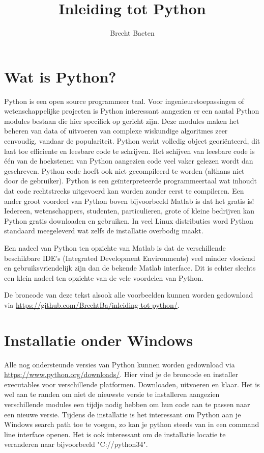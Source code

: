 \documentclass[11pt,twoside]{article}
\title{Inleiding tot Python}
\author{Brecht Baeten}
\begin{document}
	\maketitle

	\section{Wat is Python?}
Python is een open source programmeer taal. Voor ingenieurstoepassingen of wetenschappelijke projecten is Python interessant aangezien er een aantal Python modules bestaan die hier specifiek op gericht zijn. Deze modules maken het beheren van data of uitvoeren van complexe wiskundige algoritmes zeer eenvoudig, vandaar de populariteit. Python werkt volledig object georiënteerd, dit laat toe efficiente en leesbare code te schrijven. Het schijven van leesbare code is één van de hoekstenen van Python aangezien code veel vaker gelezen wordt dan geschreven. Python code hoeft ook niet gecompileerd te worden (althans niet door de gebruiker). Python is een geïnterpreteerde programmeertaal wat inhoudt dat code rechtstreeks uitgevoerd kan worden zonder eerst te compileren. Een ander groot voordeel van Python boven bijvoorbeeld Matlab is dat het gratis is! Iedereen, wetenschappers, studenten, particulieren, grote of kleine bedrijven kan Python gratis downloaden en gebruiken. In veel Linux distributies word Python standaard meegeleverd wat zelfs de installatie overbodig maakt.

Een nadeel van Python ten opzichte van Matlab is dat de verschillende beschikbare IDE's (Integrated Development Environments) veel minder vloeiend en gebruiksvriendelijk zijn dan de bekende Matlab interface. Dit is echter slechts een klein nadeel ten opzichte van de vele voordelen van Python.

De broncode van deze tekst alsook alle voorbeelden kunnen worden gedownload via \url{https://github.com/BrechtBa/inleiding-tot-python/}.

	\section{Installatie onder Windows}
Alle nog ondersteunde versies van Python kunnen worden gedownload via \url{https://www.python.org/downloads/}. Hier vind je de broncode en installer executables voor verschillende platformen. Downloaden, uitvoeren en klaar. Het is wel aan te randen om niet de nieuwste versie te installeren aangezien verschillende modules een tijdje nodig hebben om hun code aan te passen naar een nieuwe versie. Tijdens de installatie is het interessant om Python aan je Windows search path toe te voegen, zo kan je python steeds van in een command line interface openen. Het is ook interessant om de installatie locatie te veranderen naar bijvoorbeeld  "\textsf{C://python34}".
\end{document}
